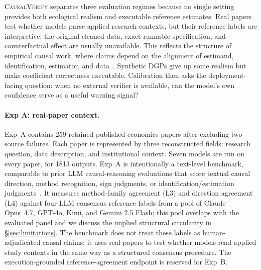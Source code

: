 \documentclass{article}
\begin{document}
\textsc{CausalVerify} separates three evaluation regimes because no single
setting provides both ecological realism and executable reference estimates.
Real papers test whether models parse applied research contexts, but their
reference labels are interpretive: the original cleaned data, exact runnable
specification, and counterfactual effect are usually unavailable. This
reflects the structure of empirical causal work, where claims depend on
the alignment of estimand, identification, estimator, and
data~\citep{angrist2009mostly,imbens2015causal}.
Synthetic DGPs give up some realism but make coefficient correctness
executable. Calibration then asks the deployment-facing question: when no
external verifier is available, can the model's own confidence serve as a
useful warning signal?

\paragraph{Exp A: real-paper context.}
Exp~A contains 259 retained published economics papers after excluding
two source failures. Each paper is represented by three reconstructed
fields: research question, data description, and institutional context.
Seven models are run on every paper, for 1813 outputs. Exp~A is
intentionally a text-level benchmark, comparable to prior LLM
causal-reasoning evaluations that score textual causal direction, method
recognition, sign judgments, or identification/estimation
judgments~\citep{jin2023cladder,jin2024corr2cause,lee2025econcausal,
sawarni2026causalreasoningbenchmark}. It measures method-family agreement (L3) and direction agreement (L4)
against four-LLM consensus reference labels from a pool of Claude
Opus~4.7, GPT-4o, Kimi, and Gemini 2.5 Flash; this pool overlaps with
the evaluated panel and we discuss the implied structural circularity in
§\ref{sec:limitations}. The benchmark does not treat these labels as
human-adjudicated causal claims; it uses real papers to test whether
models read applied study contexts in the same way as a structured
consensus procedure. The execution-grounded reference-agreement
endpoint is reserved for Exp~B.
\end{document}

